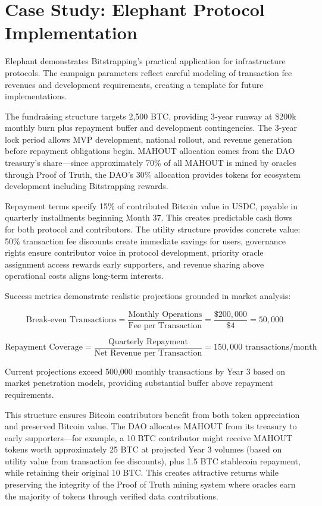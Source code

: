 \section{Case Study: Elephant Protocol Implementation}

Elephant demonstrates Bitstrapping's practical application for infrastructure protocols. The campaign parameters reflect careful modeling of transaction fee revenues and development requirements, creating a template for future implementations.

The fundraising structure targets 2,500 BTC, providing 3-year runway at \$200k monthly burn plus repayment buffer and development contingencies. The 3-year lock period allows MVP development, national rollout, and revenue generation before repayment obligations begin. MAHOUT allocation comes from the DAO treasury's share—since approximately 70\% of all MAHOUT is mined by oracles through Proof of Truth, the DAO's 30\% allocation provides tokens for ecosystem development including Bitstrapping rewards.

Repayment terms specify 15\% of contributed Bitcoin value in USDC, payable in quarterly installments beginning Month 37. This creates predictable cash flows for both protocol and contributors. The utility structure provides concrete value: 50\% transaction fee discounts create immediate savings for users, governance rights ensure contributor voice in protocol development, priority oracle assignment access rewards early supporters, and revenue sharing above operational costs aligns long-term interests.

Success metrics demonstrate realistic projections grounded in market analysis:

\[
\text{Break-even Transactions} = \frac{\text{Monthly Operations}}{\text{Fee per Transaction}} = \frac{\$200{,}000}{\$4} = 50{,}000
\]

\[
\text{Repayment Coverage} = \frac{\text{Quarterly Repayment}}{\text{Net Revenue per Transaction}} = 150{,}000 \text{ transactions/month}
\]

Current projections exceed 500,000 monthly transactions by Year 3 based on market penetration models, providing substantial buffer above repayment requirements.

This structure ensures Bitcoin contributors benefit from both token appreciation and preserved Bitcoin value. The DAO allocates MAHOUT from its treasury to early supporters—for example, a 10 BTC contributor might receive MAHOUT tokens worth approximately 25 BTC at projected Year 3 volumes (based on utility value from transaction fee discounts), plus 1.5 BTC stablecoin repayment, while retaining their original 10 BTC. This creates attractive returns while preserving the integrity of the Proof of Truth mining system where oracles earn the majority of tokens through verified data contributions.

